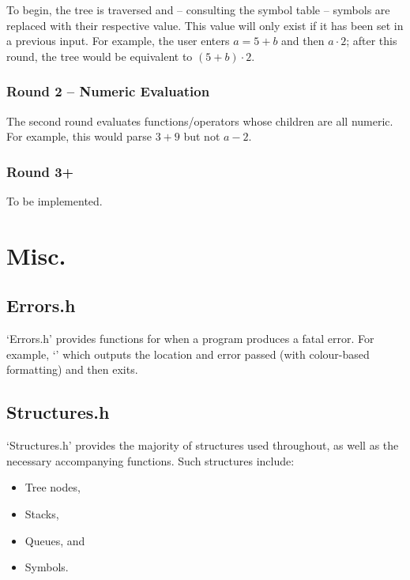                 To begin, the tree is traversed and -- consulting the symbol table -- symbols are replaced with their respective value. This value will only exist if it has been set in a previous input. For example, the user enters $a = 5 + b$ and then $a \cdot 2$; after this round, the tree would be equivalent to $(5 + b) \cdot 2$.

            \subsubsection{Round 2 -- Numeric Evaluation}
                The second round evaluates functions/operators whose children are all numeric. For example, this would parse $3 + 9$ but not $a - 2$. 

            \subsubsection{Round 3+}
                To be implemented.

    \section{Misc.}
        \subsection{Errors.h}
            `Errors.h' provides functions for when a program produces a fatal error. For example, `' which outputs the location and error passed (with colour-based formatting) and then exits. 

        \subsection{Structures.h}
            `Structures.h' provides the majority of structures used throughout, as well as the necessary accompanying functions. Such structures include:
            \begin{itemize}
                \item Tree nodes,
                \item Stacks,
                \item Queues, and
                \item Symbols.
            \end{itemize}
